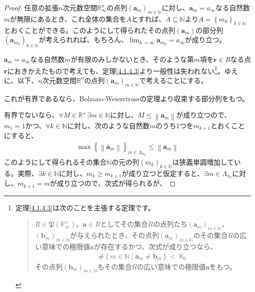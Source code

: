 \documentclass[dvipdfmx]{jsarticle}
\begin{document}
\begin{proof}
任意の拡張$n$次元数空間$\mathbb{R}_{\infty}^{n}$の点列$\left( \mathbf{a}_{m} \right)_{m \in \mathbb{N}}$に対し、$\mathbf{a}_{m} = a_{\infty}$なる自然数$m$が無限にあるとき、これ全体の集合を$A$とすれば、$A \subseteq \mathbb{N}$より$A = \left\{ m_{k} \right\}_{k \in \mathbb{N}}$とおくことができる。このようにして得られたその点列$\left( \mathbf{a}_{m} \right)$の部分列$\left( \mathbf{a}_{m_{k}} \right)_{k \in \mathbb{N}}$が考えられれば、もちろん、$\lim_{k \rightarrow \infty}\mathbf{a}_{m_{k}} = a_{\infty}$が成り立つ。\par
$\mathbf{a}_{m} = a_{\infty}$なる自然数$m$が有限のみしかないとき、そのような第$m$項を$\mathbf{r} \in R$なる点$\mathbf{r}$におきかえたもので考えても、定理\ref{4.1.4.3}より一般性は失われない\footnote{定理\ref{4.1.4.3}は次のことを主張する定理です。
\begin{quote}
$R \in \mathfrak{P}\left( \mathbb{R}_{\infty}^{n} \right)$、$\mathbf{a} \in R$としてその集合$R$の点列たち$\left( \mathbf{a}_{m} \right)_{m \in \mathbb{N}}$、$\left( \mathbf{b}_{m} \right)_{m \in \mathbb{N}}$が与えられたとき、その点列$\left( \mathbf{a}_{m} \right)_{m \in \mathbb{N}}$のその集合$R$の広い意味での極限値$\mathbf{a}$が存在するかつ、次式が成り立つなら、
\begin{align*}
\#\left\{ m \in \mathbb{N} \middle| \mathbf{a}_{m} \neq \mathbf{b}_{m} \right\} < \aleph_{0}
\end{align*}
その点列$\left( \mathbf{b}_{m} \right)_{m \in \mathbb{N}}$もその集合$R$の広い意味での極限値$\mathbf{a}$をもつ。
\end{quote}
}。ゆえに、以下、$n$次元数空間$\mathbb{R}^{n}$の点列$\left( \mathbf{a}_{m} \right)_{m \in \mathbb{N}}$で考えることにする。\par
これが有界であるなら、Bolzano-Weierstrassの定理より収束する部分列をもつ。\par
有界でないなら、$\forall M \in \mathbb{R}^{+}\exists m \in \mathbb{N}$に対し、$M \leq \left\| \mathbf{a}_{m} \right\|$が成り立つので、$m_{1} = 1$かつ、$\forall k \in \mathbb{N}$に対し、次のような自然数$m$のうち1つを$m_{k + 1}$とおくことにすると、
\begin{align*}
\max\left\{ \left\| \mathbf{a}_{m} \right\| \right\}_{m \in \varLambda_{m_{k}}} \leq \left\| \mathbf{a}_{m} \right\|
\end{align*}
このようにして得られるその集合$\mathbb{N}$の元の列$\left( m_{k} \right)_{k \in \mathbb{N}}$は狭義単調増加している。実際、$\exists k \in \mathbb{N}$に対し、$m_{k} \geq m_{k + 1}$が成り立つと仮定すると、$\exists m \in \varLambda_{n_{k}}$に対し、$m_{k + 1} = m$が成り立つので、次式が得られるが、

\end{proof}
\end{document}
